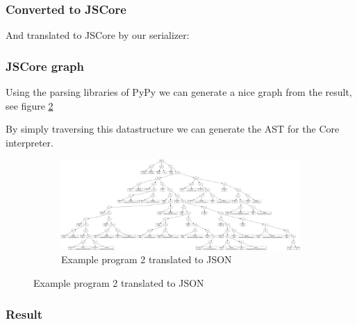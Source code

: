 
\subsubsection{Converted to JSCore}

And translated to JSCore by our serializer:

\begin{footnotesize}

\end{footnotesize}

\subsubsection{JSCore graph}

Using the parsing libraries of PyPy we can generate a nice graph from the result, 
see figure \ref{fig:fibgraph}

By simply traversing this datastructure we can generate the AST for the Core interpreter.

\begin{figure}
\begin{figure}[H]
\includegraphics[width=\textwidth]{../interpreter/tests/fib.png}
\caption{Example program 2 translated to JSON}
\label{fig:fibgraph}
\end{figure}
\end{figure}

\subsubsection{Result}

